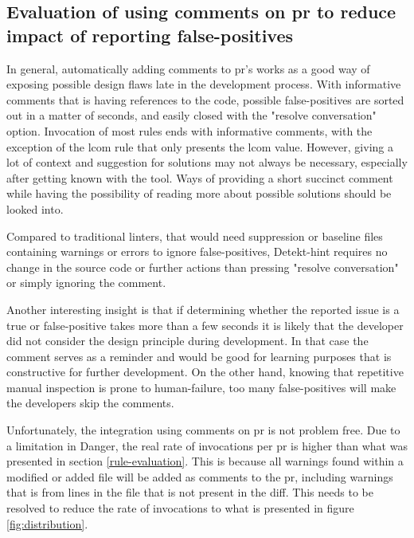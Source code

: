 \documentclass{report}
\begin{document}
\begin{itemize}
\end{itemize}




\subsection{Evaluation of using comments on \gls{pr} to reduce impact of reporting false-positives}
\label{evaluation-comments}
In general, automatically adding comments to \gls{pr}'s works as a good way of exposing possible design flaws late in the development process. With informative comments that is having references to the code, possible false-positives are sorted out in a matter of seconds, and easily closed with the "resolve conversation" option. Invocation of most rules ends with informative comments, with the exception of the \gls{lcom} rule that only presents the \gls{lcom} value. However, giving a lot of context and suggestion for solutions may not always be necessary, especially after getting known with the tool. Ways of providing a short succinct comment while having the possibility of reading more about possible solutions should be looked into.

Compared to traditional linters, that would need suppression or baseline files containing warnings or errors to ignore false-positives, Detekt-hint requires no change in the source code or further actions than pressing "resolve conversation" or simply ignoring the comment.  

Another interesting insight is that if determining whether the reported issue is a true or false-positive takes more than a few seconds it is likely that the developer did not consider the design principle during development. In that case the comment serves as a reminder and would be good for learning purposes that is constructive for further development. On the other hand, knowing that repetitive manual inspection is prone to human-failure, too many false-positives will make the developers skip the comments.

Unfortunately, the integration using comments on \gls{pr} is not problem free. Due to a limitation in Danger, the real rate of invocations per \gls{pr} is higher than what was presented in section \ref{rule-evaluation}. This is because all warnings found within a modified or added file will be added as comments to the pr, including warnings that is from lines in the file that is not present in the diff. This needs to be resolved to reduce the rate of invocations to what is presented in figure \ref{fig:distribution}.
\end{document}
